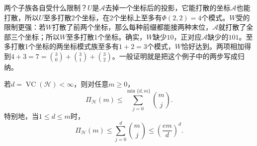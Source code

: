 两个子族各自受什么限制？$U$是$\mathcal A$去掉一个坐标后的投影，它能打散的坐标$\mathcal A$也能打散，所以$U$至多打散2个坐标，在2个坐标上至多有$\Phi(2,2)=4$个模式。$W$受的限制更强：若$W$打散了前两个坐标，那么每种前缀都能接两种末位，$\mathcal A$就打散了全部三个坐标；所以$W$至多打散1个坐标。确实，$W$缺少$10$，正对应$\mathcal A$缺少的$101$。至多打散1个坐标的两坐标模式族至多有$1+2=3$个模式，$W$恰好达到。两项相加得到$4+3=7=\binom30+\binom31+\binom32$。一般证明就是把这个例子中的两步写成归纳。

\begin{lemma}
\label{lem:sauer-shelah}
\label{lem:learning-sauer-shelah}
若$d=\operatorname{VC}(\mathcal H)<\infty$，则对任意$m\geq0$，
\[
 \Pi_{\mathcal H}(m)\leq\sum_{j=0}^{\min\{d,m\}}\binom mj.
\]
特别地，当$1\leq d\leq m$时，
\begin{equation}
 \Pi_{\mathcal H}(m)\leq\sum_{j=0}^{d}\binom mj
 \leq\left(\frac{em}{d}\right)^d.
 \label{eq:sauer-shelah}
\end{equation}
\end{lemma}

